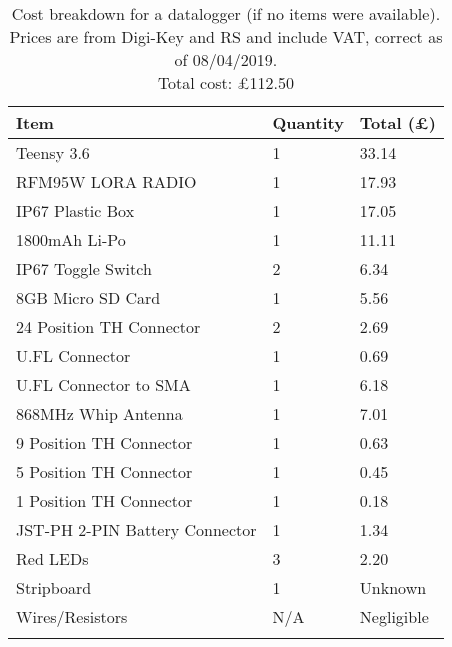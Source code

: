 \begin{table}[H]
\centering
\caption[Cost breakdown for a project datalogger]{Cost breakdown for a datalogger (if no items were available). Prices are from Digi-Key and RS and include VAT, correct as of 08/04/2019. \\ Total cost: \pounds112.50}
\label{fig:datalogger_cost}
\begin{tabular}{p{8cm}|p{2cm}|p{3cm}}
\toprule
\textbf{Item} & \textbf{Quantity} & \textbf{Total (\pounds)} \\
\midrule
Teensy 3.6 & 1 & 33.14 \\
RFM95W LORA RADIO & 1 & 17.93 \\
IP67 Plastic Box & 1 & 17.05 \\
1800mAh Li-Po & 1 & 11.11 \\
IP67 Toggle Switch & 2 & 6.34 \\
8GB Micro SD Card & 1 & 5.56 \\
24 Position TH Connector & 2 & 2.69 \\
U.FL Connector & 1 & 0.69 \\
U.FL Connector to SMA & 1 & 6.18 \\ 
868MHz Whip Antenna & 1 & 7.01 \\
9 Position TH Connector & 1 & 0.63 \\
5 Position TH Connector & 1 & 0.45 \\
1 Position TH Connector & 1 & 0.18 \\
JST-PH 2-PIN Battery Connector & 1 & 1.34 \\
Red LEDs & 3 & 2.20 \\
Stripboard & 1 & Unknown \\
Wires/Resistors & N/A & Negligible \\
\addlinespace\bottomrule
\end{tabular}
\end{table}